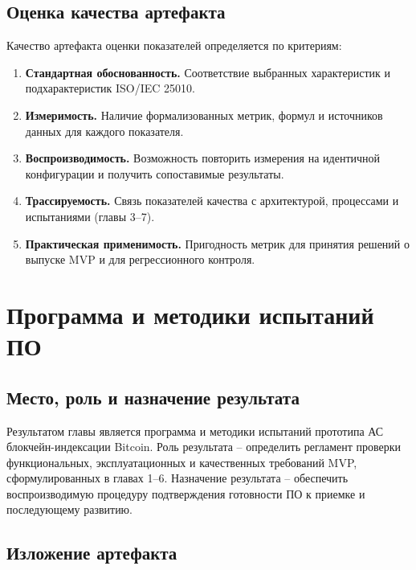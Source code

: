 ﻿\documentclass[14pt,a4paper]{extarticle}
\begin{document}
\subsection{Оценка качества артефакта}
\noindent Качество артефакта оценки показателей определяется по критериям:
\begin{enumerate}
  \item \textbf{Стандартная обоснованность.} Соответствие выбранных характеристик и подхарактеристик ISO/IEC 25010.
  \item \textbf{Измеримость.} Наличие формализованных метрик, формул и источников данных для каждого показателя.
  \item \textbf{Воспроизводимость.} Возможность повторить измерения на идентичной конфигурации и получить сопоставимые результаты.
  \item \textbf{Трассируемость.} Связь показателей качества с архитектурой, процессами и испытаниями (главы 3--7).
  \item \textbf{Практическая применимость.} Пригодность метрик для принятия решений о выпуске MVP и для регрессионного контроля.
\end{enumerate}

\newpage

\section{Программа и методики испытаний ПО}

\subsection{Место, роль и назначение результата}
\noindent Результатом главы является программа и методики испытаний прототипа АС блокчейн-индексации Bitcoin. Роль результата -- определить регламент проверки функциональных, эксплуатационных и качественных требований MVP, сформулированных в главах 1--6. Назначение результата -- обеспечить воспроизводимую процедуру подтверждения готовности ПО к приемке и последующему развитию.

\subsection{Изложение артефакта}
\end{document}
